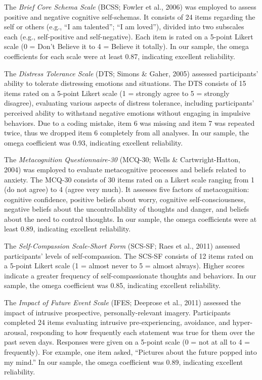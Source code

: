 \documentclass[
  man,floatsintext]{apa7}
\begin{document}
The \emph{Brief Core Schema Scale} (BCSS; Fowler et al., 2006) was employed to assess positive and negative cognitive self-schemas.
It consists of 24 items regarding the self or others (e.g., ``I am talented''; ``I am loved''), divided into two subscales each (e.g., self-positive and self-negative).
Each item is rated on a 5-point Likert scale (0 = Don't Believe it to 4 = Believe it totally).
In our sample, the omega coefficients for each scale were at least 0.87, indicating excellent reliability.

The \emph{Distress Tolerance Scale} (DTS; Simons \& Gaher, 2005) assessed participants' ability to tolerate distressing emotions and situations.
The DTS consists of 15 items rated on a 5-point Likert scale (1 = strongly agree to 5 = strongly disagree), evaluating various aspects of distress tolerance, including participants' perceived ability to withstand negative emotions without engaging in impulsive behaviors.
Due to a coding mistake, item 6 was missing and item 7 was repeated twice, thus we dropped item 6 completely from all analyses.
In our sample, the omega coefficient was 0.93, indicating excellent reliability.

The \emph{Metacognition Questionnaire-30} (MCQ-30; Wells \& Cartwright-Hatton, 2004) was employed to evaluate metacognitive processes and beliefs related to anxiety.
The MCQ-30 consists of 30 items rated on a Likert scale ranging from 1 (do not agree) to 4 (agree very much).
It assesses five factors of metacognition: cognitive confidence, positive beliefs about worry, cognitive self-consciousness, negative beliefs about the uncontrollability of thoughts and danger, and beliefs about the need to control thoughts.
In our sample, the omega coefficients were at least 0.89, indicating excellent reliability.

The \emph{Self-Compassion Scale-Short Form} (SCS-SF; Raes et al., 2011) assessed participants' levels of self-compassion.
The SCS-SF consists of 12 items rated on a 5-point Likert scale (1 = almost never to 5 = almost always).
Higher scores indicate a greater frequency of self-compassionate thoughts and behaviors.
In our sample, the omega coefficient was 0.85, indicating excellent reliability.

The \emph{Impact of Future Event Scale} (IFES; Deeprose et al., 2011) assessed the impact of intrusive prospective, personally-relevant imagery.
Participants completed 24 items evaluating intrusive pre-experiencing, avoidance, and hyper-arousal, responding to how frequently each statement was true for them over the past seven days.
Responses were given on a 5-point scale (0 = not at all to 4 = frequently).
For example, one item asked, ``Pictures about the future popped into my mind.''
In our sample, the omega coefficient was 0.89, indicating excellent reliability.
\end{document}
